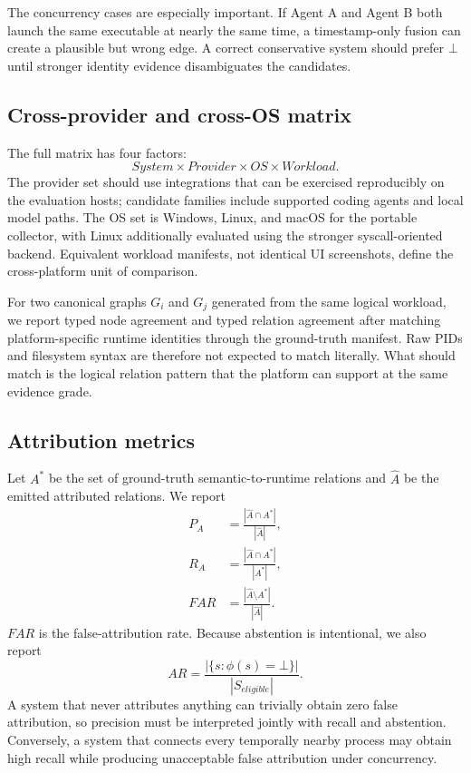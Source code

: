 The concurrency cases are especially important. If Agent A and Agent B both launch the same executable at nearly the same time, a timestamp-only fusion can create a plausible but wrong edge. A correct conservative system should prefer $\bot$ until stronger identity evidence disambiguates the candidates.

\subsection{Cross-provider and cross-OS matrix}
The full matrix has four factors:
\begin{equation}
\textit{System}\times\textit{Provider}\times\textit{OS}\times\textit{Workload}.
\end{equation}
The provider set should use integrations that can be exercised reproducibly on the evaluation hosts; candidate families include supported coding agents and local model paths. The OS set is Windows, Linux, and macOS for the portable collector, with Linux additionally evaluated using the stronger syscall-oriented backend. Equivalent workload manifests, not identical UI screenshots, define the cross-platform unit of comparison.

For two canonical graphs $G_i$ and $G_j$ generated from the same logical workload, we report typed node agreement and typed relation agreement after matching platform-specific runtime identities through the ground-truth manifest. Raw PIDs and filesystem syntax are therefore not expected to match literally. What should match is the logical relation pattern that the platform can support at the same evidence grade.

\subsection{Attribution metrics}
Let $A^*$ be the set of ground-truth semantic-to-runtime relations and $\hat A$ be the emitted attributed relations. We report
\begin{align}
P_A &= \frac{|\hat A\cap A^*|}{|\hat A|},\\
R_A &= \frac{|\hat A\cap A^*|}{|A^*|},\\
FAR &= \frac{|\hat A\setminus A^*|}{|\hat A|}.
\end{align}
$FAR$ is the false-attribution rate. Because abstention is intentional, we also report
\begin{equation}
AR=\frac{|\{s:\phi(s)=\bot\}|}{|S_{eligible}|}.
\end{equation}
A system that never attributes anything can trivially obtain zero false attribution, so precision must be interpreted jointly with recall and abstention. Conversely, a system that connects every temporally nearby process may obtain high recall while producing unacceptable false attribution under concurrency.

